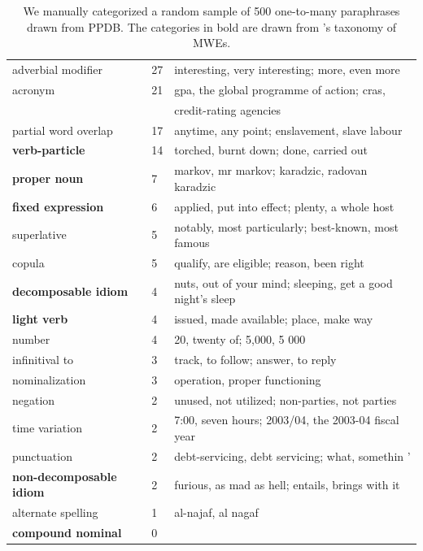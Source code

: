 \documentclass[11pt]{article}
\begin{document}
\begin{center}
\begin{table}
\begin{tabular}{|l|l|p{.5\linewidth}|}
adverbial modifier& 27 & interesting, very interesting; more, even more \\
acronym & 21 & gpa, the global programme of action; cras, \\
&& credit-rating agencies \\
partial word overlap  & 17 &  anytime, any point; enslavement, slave labour \\
\bf verb-particle & 14  & torched, burnt down; done, carried out\\
\bf proper noun & 7 & markov, mr markov; karadzic, radovan karadzic\\
\bf fixed expression & 6 & applied, put into effect; plenty, a whole host \\
superlative & 5 & notably, most particularly; best-known, most famous\\
copula & 5 & qualify, are eligible; reason, been right \\
\bf decomposable idiom & 4 & nuts, out of your mind; sleeping, get a good night's sleep\\
\bf light verb & 4  &  issued, made available; place, make way \\
number & 4 & 20, twenty of; 5,000, 5 000\\
infinitival to & 3 & track, to follow; answer, to reply \\
nominalization & 3 &  operation, proper functioning \\
negation & 2 & unused, not utilized; non-parties, not parties  \\
time variation & 2 & 7:00, seven hours; 2003/04, the 2003-04 fiscal year\\
punctuation & 2 & debt-servicing, debt servicing; what, somethin '\\
\bf non-decomposable idiom & 2 & furious, as mad as hell; entails, brings with it\\
alternate spelling & 1 & al-najaf, al nagaf\\
\bf compound nominal & 0 &\\
\hline
\end{tabular}
\hfill{}
\caption{\label{big-table} We manually categorized a random sample of 500 one-to-many paraphrases drawn from PPDB.  The categories in bold are drawn from 's taxonomy of MWEs.  }
\end{table}
\end{center}
\end{document}
